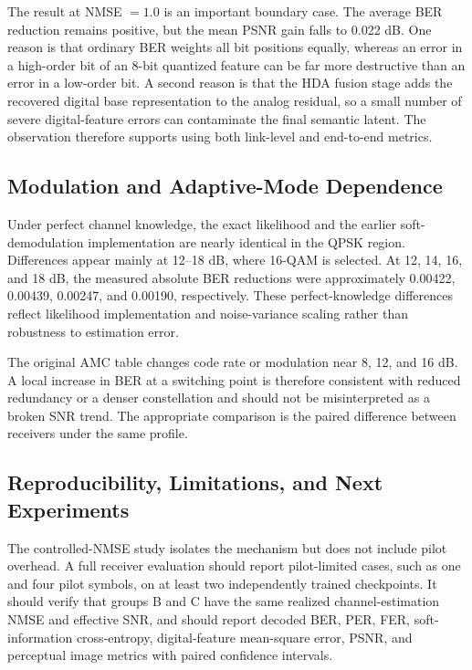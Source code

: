 \documentclass[conference]{IEEEtran}
\newcommand{\BER}{BER}
\newcommand{\PER}{PER}
\newcommand{\FER}{FER}
\newcommand{\PSNR}{PSNR}
\newcommand{\NMSE}{NMSE}
\newcommand{\AMC}{AMC}
\begin{document}
The result at \NMSE{} $=1.0$ is an important boundary case. The average \BER{} reduction remains positive, but the mean \PSNR{} gain falls to 0.022 dB. One reason is that ordinary \BER{} weights all bit positions equally, whereas an error in a high-order bit of an 8-bit quantized feature can be far more destructive than an error in a low-order bit. A second reason is that the HDA fusion stage adds the recovered digital base representation to the analog residual, so a small number of severe digital-feature errors can contaminate the final semantic latent. The observation therefore supports using both link-level and end-to-end metrics.

\subsection{Modulation and Adaptive-Mode Dependence}
Under perfect channel knowledge, the exact likelihood and the earlier soft-demodulation implementation are nearly identical in the QPSK region. Differences appear mainly at 12--18 dB, where 16-QAM is selected. At 12, 14, 16, and 18 dB, the measured absolute \BER{} reductions were approximately 0.00422, 0.00439, 0.00247, and 0.00190, respectively. These perfect-knowledge differences reflect likelihood implementation and noise-variance scaling rather than robustness to estimation error.

The original \AMC{} table changes code rate or modulation near 8, 12, and 16 dB. A local increase in \BER{} at a switching point is therefore consistent with reduced redundancy or a denser constellation and should not be misinterpreted as a broken SNR trend. The appropriate comparison is the paired difference between receivers under the same profile.

\subsection{Reproducibility, Limitations, and Next Experiments}
The controlled-\NMSE{} study isolates the mechanism but does not include pilot overhead. A full receiver evaluation should report pilot-limited cases, such as one and four pilot symbols, on at least two independently trained checkpoints. It should verify that groups B and C have the same realized channel-estimation \NMSE{} and effective SNR, and should report decoded \BER{}, \PER{}, \FER{}, soft-information cross-entropy, digital-feature mean-square error, \PSNR{}, and perceptual image metrics with paired confidence intervals.
\end{document}
